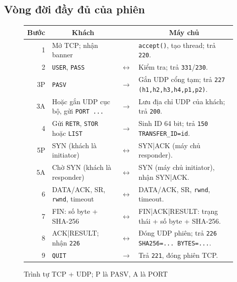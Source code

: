 \subsection{Vòng đời đầy đủ của phiên}
\begin{figure}[H]\centering\small
\renewcommand{\arraystretch}{1.28}
\begin{tabular}{r p{5.1cm} c p{5.1cm}}
\textbf{Bước}&\multicolumn{1}{c}{\textbf{Khách}}&&\multicolumn{1}{c}{\textbf{Máy chủ}}\\\hline
1&Mở TCP; nhận banner&&\texttt{accept()}, tạo thread; trả \texttt{220}.\\
2&\texttt{USER}, \texttt{PASS}&$\longleftrightarrow$&Kiểm tra; trả \texttt{331}/\texttt{230}.\\
3P&\texttt{PASV}&$\longrightarrow$&Gắn UDP cổng tạm; trả \texttt{227 (h1,h2,h3,h4,p1,p2)}.\\
3A&Hoặc gắn UDP cục bộ, gửi \texttt{PORT ...}&$\longrightarrow$&Lưu địa chỉ UDP của khách; trả \texttt{200}.\\
4&Gửi \texttt{RETR}, \texttt{STOR} hoặc \texttt{LIST}&$\longrightarrow$&Sinh ID 64 bit; trả \texttt{150 TRANSFER\_ID=id}.\\
5P&SYN (khách là initiator)&$\longleftrightarrow$&SYN|ACK (máy chủ responder).\\
5A&Chờ SYN (khách là responder)&$\longleftrightarrow$&SYN (máy chủ initiator), nhận SYN|ACK.\\
6&DATA/ACK, SR, \texttt{rwnd}, timeout&$\longleftrightarrow$&DATA/ACK, SR, \texttt{rwnd}, timeout.\\
7&FIN: số byte + SHA-256&$\longleftrightarrow$&FIN|ACK|RESULT: trạng thái + số byte + SHA-256.\\
8&ACK|RESULT; nhận \texttt{226}&$\longleftrightarrow$&Đóng UDP phiên; trả \texttt{226 SHA256=... BYTES=...}.\\
9&\texttt{QUIT}&$\longrightarrow$&Trả \texttt{221}, đóng phiên TCP.\\\hline
\end{tabular}
\caption{Trình tự TCP + UDP; P là PASV, A là PORT}
\label{fig:lifecycle}
\end{figure}

